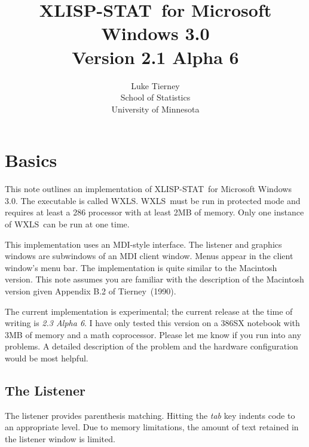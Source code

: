 
\setlength{\textwidth}{6in}
\setlength{\textheight}{8.75in}
\setlength{\topmargin}{-0.25in}
\setlength{\oddsidemargin}{0.25in}

\newcommand{\macbold}[1]{{\bf #1}}
\newcommand{\dcode}[1]{{\tt #1}}
\newcommand{\LS}{Lisp}
\newcommand{\XLS}{XLISP-STAT}
\newcommand{\WXLS}{WXLS}
\newcommand{\LSE}{LSPEDIT}

\title{\XLS\ for Microsoft Windows 3.0\\Version 2.1 Alpha 6}
\author{Luke Tierney\\School of Statistics\\University of Minnesota}


\maketitle
\section{Basics}
This note outlines an implementation of \XLS\ for Microsoft Windows
3.0. The executable is called \WXLS. \WXLS\ must be run in protected
mode and requires at least a 286 processor with at least 2MB of
memory. Only one instance of \WXLS\ can be run at one time.

This implementation uses an MDI-style interface. The listener and
graphics windows are subwindows of an MDI client window. Menus appear
in the client window's menu bar. The implementation is quite similar
to the Macintosh version. This note assumes you are familiar with the
description of the Macintosh version given Appendix B.2 of
Tierney~(1990).

The current implementation is experimental; the current release at the
time of writing is {\em 2.3 Alpha 6}.  I have only tested this version
on a 386SX notebook with 3MB of memory and a math coprocessor. Please
let me know if you run into any problems. A detailed description of
the problem and the hardware configuration would be most helpful.

\subsection{The Listener}
The listener provides parenthesis matching. Hitting the {\em tab}\/
key indents code to an appropriate level. Due to memory limitations,
the amount of text retained in the listener window is limited.

